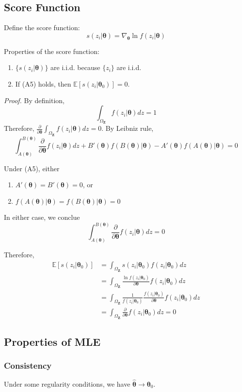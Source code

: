 \documentclass[%
 aip,
 jmp,%
 amsmath,amssymb,
 reprint,%
]{revtex4-1}
\def\th{\theta}
\def\n{\nabla}
\def\P{\mathbb{P}}
\def\E{\mathbb{E}}
\def\h{\hat}
\newcommand{\mat}[1]{\bm{#1}}
\renewcommand{\vec}[1]{\bm{#1}}
\begin{document}
\subsection{Score Function}

Define the score function:
$$ s(z_i|\vec\th) = \n_{\vec\th} \ln f(z_i|\vec\th) $$

Properties of the score function:
\begin{enumerate}
  \item $\{s(z_i|\vec\th)\}$ are i.i.d. because $\{ z_i \}$ are i.i.d.
  \item If (A5) holds, then $\E[s(z_i|\vec\th_0)] = 0$.
\end{enumerate}

\emph{Proof.}
By definition,
$$ \int_{\Omega_{\mat Z}} f(z_i|\vec\th) dz = 1 $$
Therefore, $\displaystyle \frac{\partial}{\partial \vec\th} \int_{\Omega_{\mat Z}} f(z_i|\vec\th) dz = 0$.
By Leibniz rule,
$$ \int_{A(\vec\th)}^{B(\vec\th)} \frac{\partial}{\partial \vec\th} f(z_i|\vec\th) dz
+ B'(\vec\th)f(B(\vec\th)|\vec\th) - A'(\vec\th)f(A(\vec\th)|\vec\th) = 0 $$

Under (A5), either
\begin{enumerate}
  \item $A'(\vec\th) = B'(\vec\th) = 0$, or
  \item $f(A(\vec\th)|\vec\th) = f(B(\vec\th)|\vec\th) = 0$
\end{enumerate}
In either case, we conclue
$$ \int_{A(\vec\th)}^{B(\vec\th)} \frac{\partial}{\partial \vec\th} f(z_i|\vec\th) dz = 0 $$

Therefore,
\begin{align*}
\E[s(z_i|\vec\th_0)] &= \int_{\Omega_{\mat Z}} s(z_i|\vec\th_0) f(z_i|\vec\th_0) dz \\
 &= \int_{\Omega_{\mat Z}} \frac{\ln f(z_i|\vec\th_0)}{\partial\vec\th}f(z_i|\vec\th_0) dz\\
 &= \int_{\Omega_{\mat Z}} \frac{1}{f(z_i|\vec\th_0)} \frac{f(z_i|\vec\th_0)}{\partial\vec\th}f(z_i|\vec\th_0) dz\\
 &= \int_{\Omega_{\mat Z}} \frac{\partial}{\partial \vec\th} f(z_i|\vec\th_0) dz = 0
\end{align*}

\subsection{Properties of MLE}

\subsubsection{Consistency}
Under some regularity conditions, we have $\vec{\h\th} \to \vec\th_0$.
\end{document}
